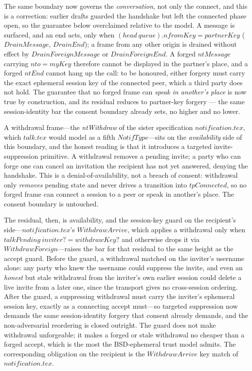 \documentclass[a4paper,10pt,fleqn]{article}
\begin{document}
The same boundary now governs the \emph{conversation}, not only the
connect, and this is a correction: earlier drafts guarded the
handshake but left the connected phase open, so the guarantee below
overclaimed relative to the model.  A message is surfaced, and an end
acts, only when $(head~queue).nfromKey = partnerKey$ ($DrainMessage$,
$DrainEnd$); a frame from any other origin is drained without effect
by $DrainForeignMessage$ or $DrainForeignEnd$.  A forged $ntMessage$
carrying $nto = myKey$ therefore cannot be displayed in the partner's
place, and a forged $ntEnd$ cannot hang up the call: to be honoured,
either forgery must carry the exact ephemeral session key of the
connected peer, which a third party does not hold.  The guarantee that
no forged frame can \emph{speak in another's place} is now true by
construction, and its residual reduces to partner-key forgery --- the
same session-identity bar the consent boundary already sets, no higher
and no lower.

A withdrawal frame---the \emph{ntWithdraw} of the sister specification
$notification.tex$, which $talk.tex$ would model as a fifth $NotifType$---sits
on the \emph{availability} side of this boundary, and the honest reading is
that it introduces a targeted invite-suppression primitive.  A withdrawal
removes a pending invite; a party who can forge one can cancel an invitation
the recipient has not yet answered, denying the handshake.  This is a
denial-of-availability, not a breach of consent: withdrawal only \emph{removes}
pending state and never drives a transition into $tpConnected$, so no forged
frame can connect a session to a peer or speak in another's place.  The
consent boundary is untouched.

The residual, then, is availability, and the session-key guard on the
recipient's side---$notification.tex$'s $WithdrawArrive$, which applies a
withdrawal only when $talkPending~inviter? = withdrawKey?$ and otherwise drops
it via $WithdrawForeign$---raises the bar for that residual to the same height
as the accept guard.  Before the guard, a withdrawal matched on the inviter's
username alone: any party who knew the username could suppress the invite, and
even an \emph{honest} but stale withdrawal from the inviter's own earlier
session could delete a live invite from a later one, since the transport gives
no cross-session ordering.  After the guard, a suppressing withdrawal must
carry the inviter's ephemeral session key, exactly as a connecting accept
must---so targeted suppression now demands the same session-identity forgery
that consent already demands, and the non-adversarial reordering is closed
outright.  The guard does not make withdrawal unforgeable; it makes a forged
or stale withdrawal no cheaper than a forged accept, which is the most the
BSD-ephemeral trust model admits.  The corresponding obligation on the
recipient is the $WithdrawArrive$ key match of $notification.tex$.
\end{document}
